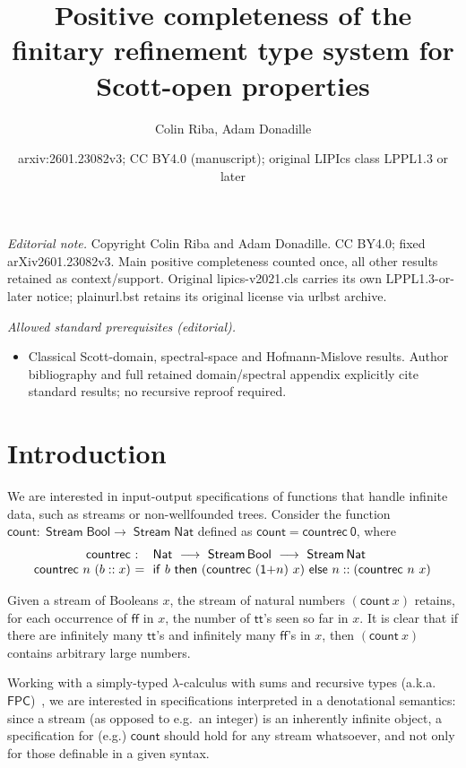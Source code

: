 \documentclass[%
  a4paper,
  UKenglish,
  cleveref,
  autoref,
  thm-restate,
  numberwithinsect,
]{lipics-v2021}
\title{Positive completeness of the finitary refinement type system for Scott-open properties}
\author{Colin Riba, Adam Donadille}
\date{arxiv:2601.23082v3; CC BY4.0 (manuscript); original LIPIcs class LPPL1.3 or later}
\newcommand\FPC{\mathsf{FPC}}
\newcommand\longto\longrightarrow
\newcommand\term[1]{\mathsf{#1}}
\newcommand\type[1]{\term{#1}}
\newcommand\Colon{\mathrel{::}}
\newcommand\cnt{\term{count}}
\newcommand\cntrec{\term{countrec}}
\newcommand\Bool{\type{Bool}}
\newcommand\Nat{\type{Nat}}
\newcommand\Stream{\mathop{\type{Stream}}}
\newcommand\true{\term{tt}}
\newcommand\false{\term{ff}}
\begin{document}
\maketitle
\noindent\textit{Editorial note.} Copyright Colin Riba and Adam Donadille. CC BY4.0; fixed arXiv2601.23082v3. Main positive completeness counted once, all other results retained as context/support. Original lipics-v2021.cls carries its own LPPL1.3-or-later notice; plainurl.bst retains its original license via urlbst archive.\par\medskip
\noindent\textit{Allowed standard prerequisites (editorial).}\begin{itemize}
\item Classical Scott-domain, spectral-space and Hofmann-Mislove results. Author bibliography and full retained domain/spectral appendix explicitly cite standard results; no recursive reproof required.
\end{itemize}\medskip
\section{Introduction}
\label{sec:intro}

We are interested in input-output
specifications of functions that handle infinite 
data, such as streams or non-wellfounded trees.
Consider the function $\cnt \colon \Stream \Bool \to \Stream \Nat$
defined as $\cnt = \cntrec\ \term 0$,
where
\[
\begin{array}{r @{~} l @{~~} l}
  \cntrec
& :
& \Nat
  ~\longto~
  \Stream \Bool
  ~\longto~
  \Stream \Nat
\\
%
  \cntrec\ n\ (b \Colon x)
& =
& \term{if}~ b 
  ~\term{then}~ (\cntrec\ (\term{1+}n)\ x)
  ~\term{else}~ n \Colon (\cntrec\ n\ x)
\end{array}
\]

\noindent
Given a stream of Booleans $x$, the stream of natural
numbers $(\cnt\ x)$ retains,
for each occurrence of $\false$ in $x$,
the number of $\true$'s seen so far in $x$.
It is clear that
if there are infinitely many $\true$'s and infinitely many $\false$'s in $x$,
then $(\cnt\ x)$ contains arbitrary large numbers.

Working with a simply-typed $\lambda$-calculus with sums and recursive types
(a.k.a.\ $\FPC$)~\cite{pierce02book},
we are interested in specifications 
interpreted in a denotational semantics:
since a stream (as opposed to e.g.\ an integer)
is an inherently infinite object, a specification for (e.g.) $\cnt$
should hold for any stream whatsoever, and not only
for those definable in a given syntax.
\end{document}
